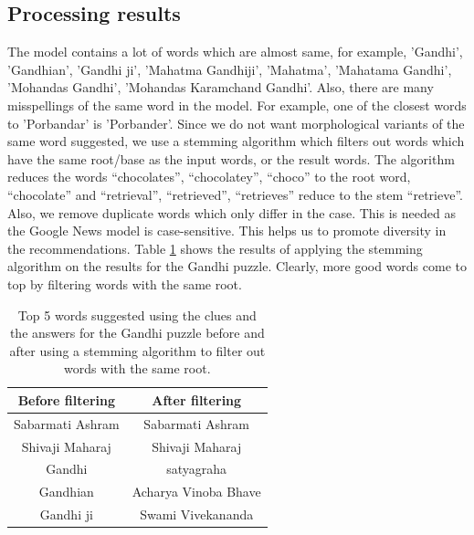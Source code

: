 \documentclass[twoside]{article}
\begin{document}
\subsection{Processing results}
\label{sec:sec3.5}
The model contains a lot of words which are almost same, for example, 'Gandhi', 'Gandhian', 'Gandhi ji', 'Mahatma Gandhiji',
'Mahatma', 'Mahatama Gandhi', 'Mohandas Gandhi', 'Mohandas Karamchand Gandhi'. Also, there are many misspellings of the same word in the model. For example, one of the closest words to 'Porbandar' is 'Porbander'. Since we do not want morphological variants of the same word suggested, we use a stemming algorithm which filters out words which have the same root/base as the input words, or the result words. The algorithm reduces the words “chocolates”, “chocolatey”, “choco” to the root word, “chocolate” and “retrieval”, “retrieved”, “retrieves” reduce to the stem “retrieve”. Also, we remove duplicate words which only differ in the case. This is needed as the Google News model is case-sensitive. This helps us to promote diversity in the recommendations. 
Table \ref{tab:table5} shows the results of applying the stemming algorithm on the results for the Gandhi puzzle. Clearly, more good words come to top by filtering words with the same root.
\begin{table}[h!]
  \begin{center}
    \begin{tabular}{c c}
      \toprule
      \textbf{Before filtering} & \textbf{After filtering}  \\ 
      \midrule
      Sabarmati Ashram & Sabarmati Ashram \\
      Shivaji Maharaj & Shivaji Maharaj\\
      Gandhi & satyagraha\\
      Gandhian & Acharya Vinoba Bhave\\
      Gandhi ji & Swami Vivekananda \\
      \bottomrule
    \end{tabular}
    \caption{Top 5 words suggested using the clues and the answers for the Gandhi puzzle before and after using a stemming algorithm to filter out words with the same root.}
    \label{tab:table5}
  \end{center}
\end{table}
\end{document}
